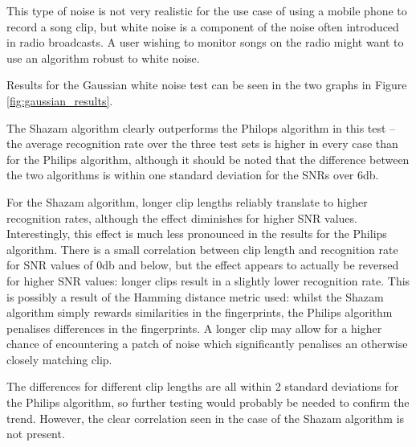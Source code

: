 \documentclass[12pt,a4paper,twoside,openright]{report}
\begin{document}
This type of noise is not very realistic for the use case of using a mobile phone to record a song clip, but white noise is a component of the noise often introduced in radio broadcasts. A user wishing to monitor songs on the radio might want to use an algorithm robust to white noise.

Results for the Gaussian white noise test can be seen in the two graphs in Figure \ref{fig:gaussian_results}. 

The Shazam algorithm clearly outperforms the Philops algorithm in this test -- the average recognition rate over the three test sets is higher in every case than for the Philips algorithm, although it should be noted that the difference between the two algorithms is within one standard deviation for the SNRs over 6db.

For the Shazam algorithm, longer clip lengths reliably translate to higher recognition rates, although the effect diminishes for higher SNR values. Interestingly, this effect is much less pronounced in the results for the Philips algorithm. There is a small correlation between clip length and recognition rate for SNR values of 0db and below, but the effect appears to actually be reversed for higher SNR values: longer clips result in a slightly lower recognition rate. This is possibly a result of the Hamming distance metric used: whilst the Shazam algorithm simply rewards similarities in the fingerprints, the Philips algorithm penalises differences in the fingerprints. A longer clip may allow for a higher chance of encountering a patch of noise which significantly penalises an otherwise closely matching clip.

The differences for different clip lengths are all within 2 standard deviations for the Philips algorithm, so further testing would probably be needed to confirm the trend. However, the clear correlation seen in the case of the Shazam algorithm is not present.
\end{document}
